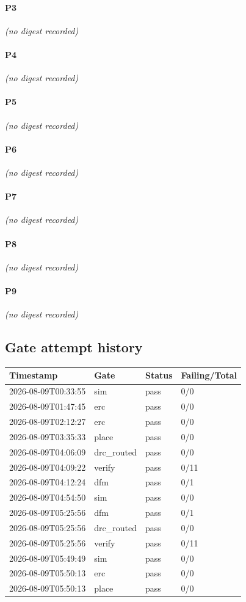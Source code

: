 \documentclass[11pt,a4paper]{article}
\begin{document}
\paragraph*{P3}
\emph{(no digest recorded)}
\paragraph*{P4}
\emph{(no digest recorded)}
\paragraph*{P5}
\emph{(no digest recorded)}
\paragraph*{P6}
\emph{(no digest recorded)}
\paragraph*{P7}
\emph{(no digest recorded)}
\paragraph*{P8}
\emph{(no digest recorded)}
\paragraph*{P9}
\emph{(no digest recorded)}
\subsection*{Gate attempt history}
{\small
\begin{longtable}{llll}
\toprule
\textbf{Timestamp} & \textbf{Gate} & \textbf{Status} & \textbf{Failing/Total} \\
\midrule
\endhead
2026-08-09T00:33:55 & sim & pass & 0/0 \\
2026-08-09T01:47:45 & erc & pass & 0/0 \\
2026-08-09T02:12:27 & erc & pass & 0/0 \\
2026-08-09T03:35:33 & place & pass & 0/0 \\
2026-08-09T04:06:09 & drc\_routed & pass & 0/0 \\
2026-08-09T04:09:22 & verify & pass & 0/11 \\
2026-08-09T04:12:24 & dfm & pass & 0/1 \\
2026-08-09T04:54:50 & sim & pass & 0/0 \\
2026-08-09T05:25:56 & dfm & pass & 0/1 \\
2026-08-09T05:25:56 & drc\_routed & pass & 0/0 \\
2026-08-09T05:25:56 & verify & pass & 0/11 \\
2026-08-09T05:49:49 & sim & pass & 0/0 \\
2026-08-09T05:50:13 & erc & pass & 0/0 \\
2026-08-09T05:50:13 & place & pass & 0/0 \\
\bottomrule
\end{longtable}
}
\end{document}
